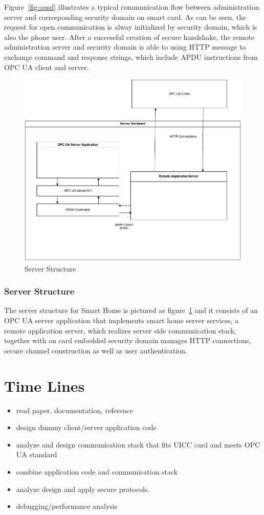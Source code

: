 \documentclass[]{llncs}
\begin{document}
Figure~\ref{fig:apsd} illustrates a typical communication flow between administration server and corresponding security domain on smart card. As can be seen, the request for open communication is alway initialized by security domain, which is also the phone user. After a successful creation of secure handshake, the remote administration server and security domain is able to using HTTP message to exchange command and response strings, which include APDU instructions from OPC UA client and server.

\begin{figure}
	\centering
	\includegraphics[width=1.0\textwidth]{serverStructure}
		\caption[ ]{Server Structure}
	\label{fig:serverStructure}
\end{figure}
\subsubsection{Server Structure}
The server structure for Smart Home is pictured as figure~\ref{fig:serverStructure} and it consists of an OPC UA server application that implements smart home server services, a remote application server, which realizes server side communication stack, together with on card embedded security domain manages HTTP connections, secure channel construction as well as user authentication. 
\section{Time Lines}
 \begin{itemize}
  \item read paper, documentation, reference
  \item design dummy client/server application code 
  \item analyze and design communication stack that fits UICC card and meets OPC UA standard 
  \item combine application code and communication stack
  \item analyze design and apply secure protocols. 
  \item debugging/performance analysis
\end{itemize}



\end{document}
